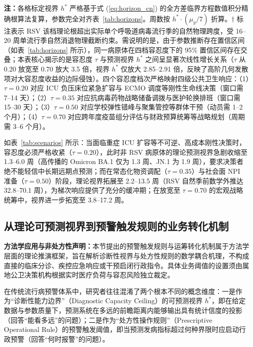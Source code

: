 \documentclass[11pt,a4paper]{article}
\theoremstyle{plain}
\theoremstyle{definition}
\begin{document}
\begin{table}[htbp]
{\begin{tabular}{lccccp{5.5cm}}
\bottomrule
\end{tabular}%
}
\vspace{2pt}
\begin{flushleft}
\scriptsize \textbf{注：}各格标定视界 $h^*$ 严格基于式 (\ref{eq:horizon_cn}) 的全方差临界方程数值积分精确根算法复算，参数完全对齐表~\ref{tab:horizons}。周数按 $h^* \cdot (\mu_g / 7)$ 折算。$\dagger$ 标注表示 RSV 该档理论根超出实际单个呼吸道病毒流行季的自然物理跨度，受 16--20 周单流行季自然消退物理截断约束。需说明的是，由于参数推断存在置信区间（如表~\ref{tab:horizons} 所示），同一病原体在四档容忍度下的 95\% 置信区间存在交叠；本表核心揭示的是容忍度 $\tau$ 与预测视界 $h^*$ 之间呈显著次线性增长关系（$\tau$ 从 0.20 放宽至 0.70 放大 3.5 倍，视界 $h^*$ 仅放大 2.85--2.91 倍，反映了高阶几何发散项对大容忍度收益的边际侵蚀）。四个容忍度档次严格映射四级公共卫生响应：（1）$\tau=0.20$ 对应 ICU 负压床位紧急扩容与 ECMO 调度等刚性生命线决策（窗口需 7--14 天）；（2）$\tau=0.35$ 对应抗病毒药物战略储备调拨与医护轮换排班（窗口需 15--30 天）；（3）$\tau=0.50$ 对应学校弹性错峰与聚集管控等群体干预（动员需 1--2 个月）；（4）$\tau=0.70$ 对应跨年度疫苗组分评估与财政预算统筹等战略规划（周期需 3--6 个月）。
\end{flushleft}
\end{table}

如表~\ref{tab:scenarios} 所示：当面临重症 ICU 扩容等不可逆、高成本刚性决策时，容忍度必须严格收紧（$\tau = 0.20$），此时非 RSV 病原体的理论预测视界急剧收缩至 1.3--6.0 周（高传播的 Omicron BA.1 仅为 1.3 周、JN.1 为 1.9 周），要求决策者绝不能轻信中长期远期点预测；而在常态化物资调配（$\tau = 0.35$）与社会面 NPI 准备（$\tau = 0.50$）阶段，理论视界拓展至 2.2--13.5 周（RSV 自然季前数学外推达 32.8--70.1 周），为梯次响应提供了充分的缓冲期；在放宽至 $\tau = 0.70$ 的宏观战略统筹中，视界进一步拓宽至 3.8--17.2 周。

\subsection{从理论可预测视界到预警触发规则的业务转化机制}
\noindent\textbf{方法学应用与非处方性声明：}本节提出的预警触发规则与运筹转化机制属于方法学层面的理论推演框架，旨在解析诊断性视界与处方性规则的数学耦合机理，不构成直接的临床分诊、疾控应急响应或干预启闭行政指令。具体业务阈值的设置须由属地公卫决策机构根据实时医疗负荷与容忍风险独立裁定。

在传统流行病预警体系中，研究者往往混淆了两个根本不同的概念维度：一是作为“诊断性能力边界”（Diagnostic Capacity Ceiling）的可预测视界 $h^*$，即在给定数据与参数质量下，预测系统在多远的前瞻距离内能够输出具有统计信度的投影（回答“能看多远”的问题）；二是作为“处方性操作规则”（Prescriptive Operational Rule）的预警触发阈值，即当预测发病指标超过何种界限时应启动行政预警（回答“何时报警”的问题）。
\end{document}
